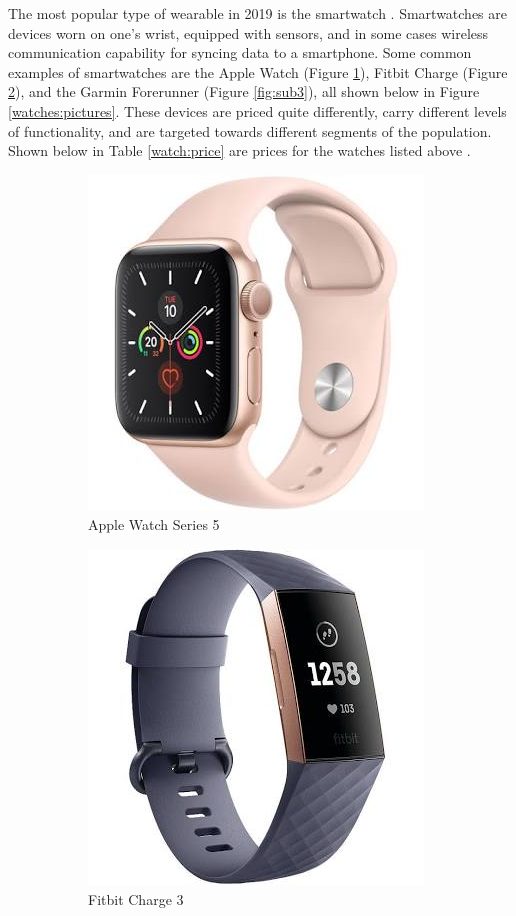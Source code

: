 The most popular type of wearable in 2019 is the smartwatch \cite{best_watches}. 
Smartwatches are devices worn on one's wrist,
equipped with sensors, and in some cases wireless communication capability for syncing data to a smartphone.
Some common examples of smartwatches are the Apple Watch (Figure \ref{fig:sub1}), 
Fitbit Charge (Figure \ref{fig:sub2}), and the Garmin Forerunner (Figure \ref{fig:sub3}),
all shown below in Figure \ref{watches:pictures}.
These devices are priced quite differently, carry different levels of functionality, and are
targeted towards different segments of the population. Shown below in Table \ref{watch:price} are 
prices for the watches listed above \cite{apple_price} \cite{fitbit_price} \cite{garmin_price}.

\begin{figure}[h]
    \centering
    \begin{subfigure}{.5\textwidth}
      \centering
      \includegraphics[width=.4\linewidth]{media/apple_pic.jpeg}
      \caption{Apple Watch Series 5 \cite{apple_price}}
      \label{fig:sub1}
    \end{subfigure}%
    \begin{subfigure}{.5\textwidth}
      \centering
      \includegraphics[width=.4\linewidth]{media/fitbit_pic.jpeg}
      \caption{Fitbit Charge 3 \cite{fitbit_price}}
      \label{fig:sub2}
    \end{subfigure}
    \begin{subfigure}{.5\textwidth}
        \centering

\end{subfigure}
\end{figure}
